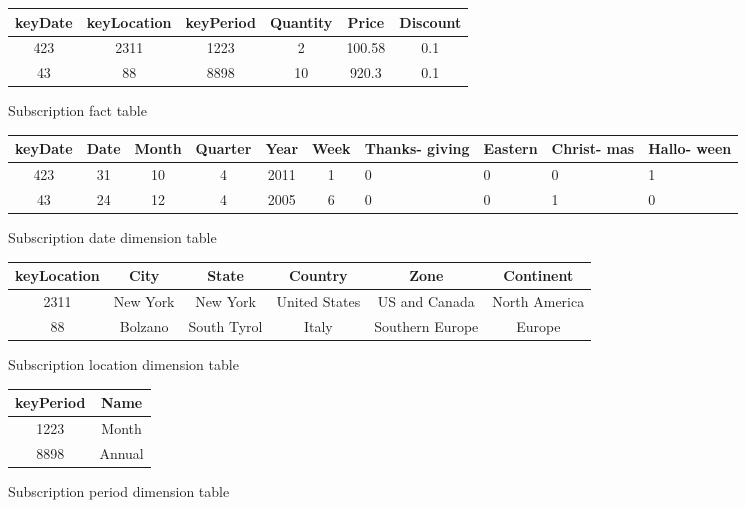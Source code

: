 \begin{figure}[!hbp]
\caption{\label{t:f_sub}Subscription fact table}
\begin{center}
\begin{tabular}{|c|c|c|c|c|c|}
\hline
keyDate & keyLocation & keyPeriod & Quantity & Price & Discount\\
\hline
\hline
423 & 2311 & 1223 & 2 & 100.58 & 0.1\\
43 & 88 & 8898 & 10 & 920.3 & 0.1\\
\hline
\end{tabular}
\end{center}
\end{figure}

\begin{figure}[!hbp]
\caption{\label{t:sub_date}Subscription date dimension table}
\begin{center}
\begin{tabular}{|c|c|c|c|c|c|p{1.3cm}|p{1.2cm}|p{1.3cm}|p{1cm}|}
\hline 
keyDate &Date&Month&Quarter& Year & Week & Thanks- giving & Eastern & Christ- mas & Hallo- ween\\
\hline
\hline
423 & 31 & 10 & 4 & 2011 & 1 & 0 & 0 & 0 & 1\\
43 & 24 & 12 & 4 & 2005 & 6 & 0 & 0 & 1 & 0\\
\hline
\end{tabular}
\end{center}
\end{figure}


\begin{figure}[!hbp]
\caption{\label{t:sub_loc|}Subscription location dimension table}
\begin{center}
\begin{tabular}{|c|c|c|c|c|c|}
\hline
keyLocation & City & State & Country & Zone & Continent\\
\hline
\hline
2311 & New York & New York & United States & US and Canada & North America\\
88 & Bolzano & South Tyrol & Italy & Southern Europe & Europe\\
\hline
\end{tabular}
\end{center}
\end{figure}

\begin{figure}[!hbp]
\caption{\label{t:sub_per}Subscription period dimension table}
\begin{center}
\begin{tabular}{|c|c|}
\hline
keyPeriod & Name\\
\hline
\hline
1223 & Month\\
8898 & Annual\\
\hline
\end{tabular}
\end{center}
\end{figure}

